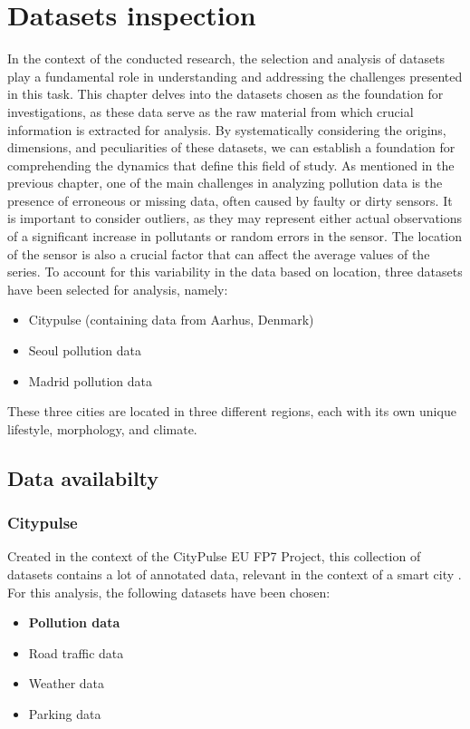 \chapter{Datasets inspection}
\label{chap:Datasets}

In the context of the conducted research, the selection and analysis of datasets play a fundamental role in understanding and addressing the challenges presented in this task. This chapter delves into the datasets chosen as the foundation for investigations, as these data serve as the raw material from which crucial information is extracted for analysis. By systematically considering the origins, dimensions, and peculiarities of these datasets, we can establish a foundation for comprehending the dynamics that define this field of study.
As mentioned in the previous chapter, one of the main challenges in analyzing pollution data is the presence of erroneous or missing data, often caused by faulty or dirty sensors. 
It is important to consider outliers, as they may represent either actual observations of a significant increase in pollutants or random errors in the sensor. The location of the sensor is also a crucial factor that can affect the average values of the series. 
To account for this variability in the data based on location, three datasets have been selected for analysis, namely:
\begin{itemize}
    \item Citypulse (containing data from Aarhus, Denmark)
    \item Seoul pollution data
    \item Madrid pollution data
\end{itemize}

These three cities are located in three different regions, each with its own unique lifestyle, morphology, and climate.

\section{Data availabilty}
\subsection{Citypulse}
Created in the context of the CityPulse EU FP7 Project, this collection of datasets contains a lot of annotated data, relevant in the context of a smart city \cite{CityPulseDataset}. For this analysis, the following datasets have been chosen:
\begin{itemize}
    \item \textbf{Pollution data}
    \item Road traffic data
    \item Weather data
    \item Parking data
\end{itemize}

